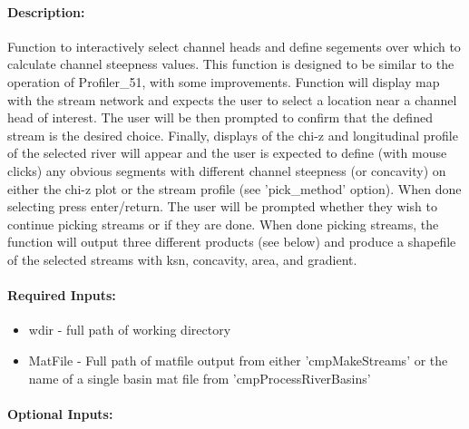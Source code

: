 \paragraph{Description:}
Function to interactively select channel heads and define segements over which to calculate channel steepness values.
This function is designed to be similar to the operation of Profiler\_51, with some improvements. Function will display map
with the stream network and expects the user to select a location near a channel head of interest. The user will be then 
prompted to confirm that the defined stream is the desired choice. Finally, displays of the chi-z and longitudinal profile 
of the selected river will appear and the user is expected to define (with mouse clicks) any obvious segments with different 
channel steepness (or concavity) on either the chi-z plot or the stream profile (see 'pick\_method' option). When done selecting 
press enter/return. The user will be prompted whether they wish to continue picking streams or if they are done. When done 
picking streams, the function will output three different products (see below) and produce a shapefile of the selected streams 
with ksn, concavity, area, and gradient.

\paragraph{Required Inputs:}
\begin{itemize}
\item wdir - full path of working directory
\item MatFile - Full path of matfile output from either 'cmpMakeStreams' or the name of a single basin mat file from 'cmpProcessRiverBasins'
\end{itemize}

\paragraph{Optional Inputs:}

